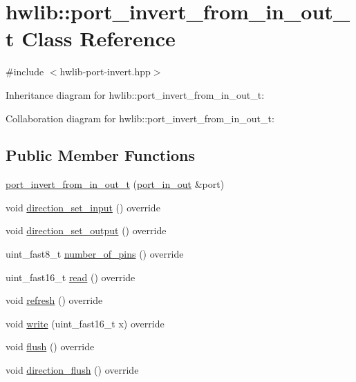 \hypertarget{classhwlib_1_1port__invert__from__in__out__t}{}\section{hwlib\+:\+:port\+\_\+invert\+\_\+from\+\_\+in\+\_\+out\+\_\+t Class Reference}
\label{classhwlib_1_1port__invert__from__in__out__t}


{\ttfamily \#include $<$hwlib-\/port-\/invert.\+hpp$>$}



Inheritance diagram for hwlib\+:\+:port\+\_\+invert\+\_\+from\+\_\+in\+\_\+out\+\_\+t\+:


Collaboration diagram for hwlib\+:\+:port\+\_\+invert\+\_\+from\+\_\+in\+\_\+out\+\_\+t\+:
\subsection*{Public Member Functions}
\begin{DoxyCompactItemize}
\item 
\hyperlink{classhwlib_1_1port__invert__from__in__out__t_a7723fe971e2ade703dfefa4407fd0a7e}{port\+\_\+invert\+\_\+from\+\_\+in\+\_\+out\+\_\+t} (\hyperlink{classhwlib_1_1port__in__out}{port\+\_\+in\+\_\+out} \&port)
\item 
void \hyperlink{classhwlib_1_1port__invert__from__in__out__t_a5af46d9dbe68de372e99ffea6617cb34}{direction\+\_\+set\+\_\+input} () override
\item 
void \hyperlink{classhwlib_1_1port__invert__from__in__out__t_a081fcd37931c8b02a8bcc61899ea5346}{direction\+\_\+set\+\_\+output} () override
\item 
uint\+\_\+fast8\+\_\+t \hyperlink{classhwlib_1_1port__invert__from__in__out__t_a150f95f7fe2520298a139cfd58293923}{number\+\_\+of\+\_\+pins} () override
\item 
uint\+\_\+fast16\+\_\+t \hyperlink{classhwlib_1_1port__invert__from__in__out__t_afabad4a7b11e0127b82015b0efbb2e41}{read} () override
\item 
void \hyperlink{classhwlib_1_1port__invert__from__in__out__t_ace7b8002a7aa10de1a22634c04751123}{refresh} () override
\item 
void \hyperlink{classhwlib_1_1port__invert__from__in__out__t_add95d20973a18e012ff97988e49aeff4}{write} (uint\+\_\+fast16\+\_\+t x) override
\item 
void \hyperlink{classhwlib_1_1port__invert__from__in__out__t_a9066c534e517baf82995863bb67cb443}{flush} () override
\item 
void \hyperlink{classhwlib_1_1port__invert__from__in__out__t_a85f7917e1b70d8eb637aede9040d2d00}{direction\+\_\+flush} () override
\end{DoxyCompactItemize}


